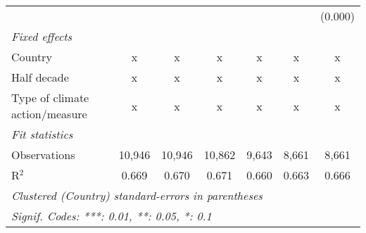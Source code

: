 \begin{tabular}{lcccccc}
                                                   &         &               &                &                &                & (0.000)\\   
   \emph{Fixed effects}\\
   Country                                         & x       & x             & x              & x              & x              & x\\  
   Half decade                                     & x       & x             & x              & x              & x              & x\\  
   Type of climate action/measure                  & x       & x             & x              & x              & x              & x\\  
   \midrule \emph{Fit statistics}\\
   Observations                                    & 10,946  & 10,946        & 10,862         & 9,643          & 8,661          & 8,661\\  
   R$^2$                                           & 0.669   & 0.670         & 0.671          & 0.660          & 0.663          & 0.666\\  
   \midrule
   \multicolumn{7}{l}{\emph{Clustered (Country) standard-errors in parentheses}}\\
   \multicolumn{7}{l}{\emph{Signif. Codes: ***: 0.01, **: 0.05, *: 0.1}}\\
\end{tabular}
\par\endgroup


